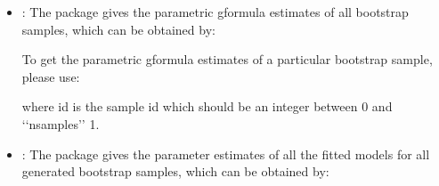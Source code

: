 \documentclass[letterpaper,10pt,english]{sphinxmanual}
\begin{document}
\begin{itemize}
\item {} 
\sphinxAtStartPar
{}: The package gives the parametric g\sphinxhyphen{}formula estimates of all
bootstrap samples, which can be obtained by:
\begin{quote}

\begin{sphinxVerbatim}[commandchars=\\\{\}]
           
  \PYG{p}{[}\PYG{p}{]}
\end{sphinxVerbatim}
\end{quote}

\sphinxAtStartPar
To get the parametric g\sphinxhyphen{}formula estimates of a particular bootstrap sample, please use:
\begin{quote}

\begin{sphinxVerbatim}[commandchars=\\\{\}]
\PYG{p}{[}\PYG{p}{]}\PYG{p}{[}\PYG{p}{]}
\end{sphinxVerbatim}
\end{quote}

\sphinxAtStartPar
where id is the sample id which should be an integer between 0 and ‘‘nsamples’’ \sphinxhyphen{} 1.

\item {} 
\sphinxAtStartPar
{}: The package gives the parameter estimates of all the fitted models for all generated
bootstrap samples, which can be obtained by:
\begin{quote}


\end{quote}
\end{itemize}
\end{document}
